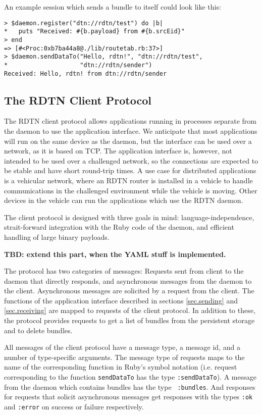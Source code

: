 \documentclass{article}
\begin{document}
An example session which sends a bundle to itself could look like this:

\begin{verbatim}
> $daemon.register("dtn://rdtn/test") do |b|
*   puts "Received: #{b.payload} from #{b.srcEid}"
> end
=> [#<Proc:0xb7ba44a8@./lib/routetab.rb:37>]
> $daemon.sendDataTo("Hello, rdtn!", "dtn://rdtn/test",
*                    "dtn://rdtn/sender")
Received: Hello, rdtn! from dtn://rdtn/sender
\end{verbatim}

\subsection{The RDTN Client Protocol}\label{sec.client-protocol}

The RDTN client protocol allows applications running in processes separate from
the daemon to use the application interface. We anticipate that most
applications will run on the same device as the daemon, but the interface can be
used over a network, as it is based on TCP. The application interface is,
however, not intended to be used over a challenged network, so the connections
are expected to be stable and have short round-trip times. A use case for
distributed applications is a vehicular network, where an RDTN router is
installed in a vehicle to handle communications in the challenged environment
while the vehicle is moving. Other devices in the vehicle can run the
applications which use the RDTN daemon.

The client protocol is designed with three goals in mind: language-independence,
strait-forward integration with the Ruby code of the daemon, and efficient
handling of large binary payloads. 

{\bf TBD: extend this part, when the YAML stuff is implemented.}

The protocol has two categories of messages: Requests sent from client to the
daemon that directly responds, and asynchronous messages from the daemon to the
client. Asynchronous messages are solicited by a request from the client. The
functions of the application interface described in sections \ref{sec.sending}
and \ref{sec.receiving} are mapped to requests of the client protocol. In
addition to these, the protocol provides requests to get a list of bundles from
the persistent storage and to delete bundles.

All messages of the client protocol have a message type, a message id, and a
number of type-specific arguments. The message type of requests maps to the name
of the corresponding function in Ruby's symbol notation (i.e. request
corresponding to the function {\tt sendDataTo} has the type {\tt :sendDataTo}).
A message from the daemon which contains bundles has the type {\tt
:bundles}. And responses for requests that solicit asynchronous messages get
responses with the types {\tt :ok} and {\tt :error} on success or failure
respectively.
\end{document}
